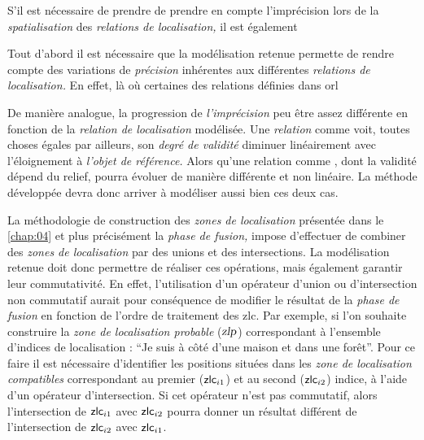 

S'il est nécessaire de prendre de prendre en compte l'imprécision lors
de la \emph{spatialisation} des \emph{relations de localisation,} il
est également 

Tout d'abord il est nécessaire que la modélisation retenue permette de
rendre compte des variations de \emph{précision} inhérentes aux
différentes \emph{relations de localisation.} En effet, là où
certaines des relations définies dans \ac{orl} 


De manière analogue, la progression de \emph{l'imprécision} peu être
assez différente en fonction de la \emph{relation de localisation}
modélisée. Une \emph{relation} comme  voit, toutes
choses égales par ailleurs, son \textsl{degré de validité} diminuer
linéairement avec l'éloignement à \emph{l'objet de référence.} Alors
qu'une relation comme , dont
la validité dépend du relief, pourra évoluer de manière différente et
non linéaire.
%
La méthode développée devra donc arriver à modéliser aussi bien ces
deux cas.



La méthodologie de construction des \emph{zones de localisation}
présentée dans le \autoref{chap:04} et plus précisément la \emph{phase
  de fusion,} impose d'effectuer de combiner des \emph{zones de
  localisation} par des unions et des intersections. La modélisation
retenue doit donc permettre de réaliser ces opérations, mais également
garantir leur commutativité. En effet, l'utilisation d'un opérateur
d'union ou d'intersection non commutatif aurait pour conséquence de
modifier le résultat de la \emph{phase de fusion} en fonction de
l'ordre de traitement des \ac{zlc}. Par exemple, si l'on souhaite
construire la \emph{zone de localisation probable}
($\text{\textsl{zlp}}$) correspondant à l'ensemble d'indices de
localisation : \enquote{Je suis à côté d'une maison et dans une
  forêt}. Pour ce faire il est nécessaire d'identifier les positions
situées dans les \emph{zone de localisation compatibles} correspondant
au premier ($\text{\textsf{zlc}}_{i1}$) et au second
($\text{\textsf{zlc}}_{i2}$) indice, à l'aide d'un opérateur
d'intersection. Si cet opérateur n'est pas commutatif, alors
l'intersection de $\text{\textsf{zlc}}_{i1}$ avec
$\text{\textsf{zlc}}_{i2}$ pourra donner un résultat différent de
l'intersection de $\text{\textsf{zlc}}_{i2}$ avec
$\text{\textsf{zlc}}_{i1}$.

